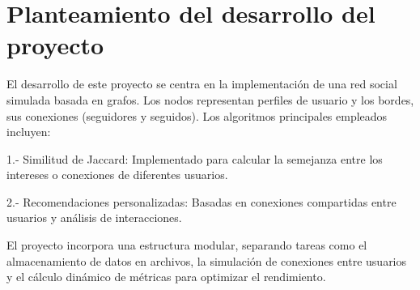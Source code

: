\section{Planteamiento del desarrollo del proyecto}
El desarrollo de este proyecto se centra en la implementación de una red social simulada basada en grafos. Los nodos representan perfiles de usuario y los bordes, sus conexiones (seguidores y seguidos). Los algoritmos principales empleados incluyen:

	1.- Similitud de Jaccard: Implementado para calcular la semejanza entre los intereses o conexiones de diferentes usuarios.

	2.- Recomendaciones personalizadas: Basadas en conexiones compartidas entre usuarios y 	análisis de interacciones.

El proyecto incorpora una estructura modular, separando tareas como el almacenamiento de datos en archivos, la simulación de conexiones entre usuarios y el cálculo dinámico de métricas para optimizar el rendimiento.
